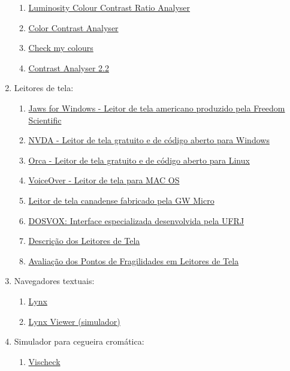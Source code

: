 \documentclass[
  12pt,
  openright,
  twoside,
  a4paper,
  english,
  french,
  spanish,
  brazil
]{abntex2}
\begin{document}
\begin{enumerate}
  \begin{enumerate}
    \item \href{http://juicystudio.com/services/luminositycontrastratio.php}{Luminosity Colour Contrast Ratio Analyser}
    \item \href{http://www.colorsontheweb.com/colorcontrast.asp}{Color Contrast Analyser}
    \item \href{http://www.checkmycolours.com}{Check my colours}
    \item \href{http://www.paciellogroup.com/resources/contrast-analyser.html}{Contrast Analyser 2.2}
  \end{enumerate}
  \item Leitores de tela:
  \begin{enumerate}
    \item \href{http://www.freedomscientific.com}{Jaws for Windows - Leitor de tela americano produzido pela Freedom Scientific}
    \item \href{http://www.nvda-project.org}{NVDA - Leitor de tela gratuito e de código aberto para Windows}
    \item \href{http://live.gnome.org/Orca}{Orca - Leitor de tela gratuito e de código aberto para Linux}
    \item \href{http://www.apple.com/br/accessibility/ios/voiceover}{VoiceOver - Leitor de tela para MAC OS}
    \item \href{http://www.gwmicro.com/Window-Eyes}{Leitor de tela canadense fabricado pela GW Micro}
    \item \href{http://intervox.nce.ufrj.br}{DOSVOX: Interface especializada desenvolvida pela UFRJ}
    \item \href{https://www.gov.br/governodigital/pt-br/acessibilidade-e-usuario/acessibilidade-digital/emag-descricao-dos-leitores-de-tela-1.pdf}{Descrição dos Leitores de Tela}
    \item \href{https://www.gov.br/governodigital/pt-br/acessibilidade-e-usuario/acessibilidade-digital/emag-pontos-de-fragilidade-dos-leitores-de-tela.pdf}{Avaliação dos Pontos de Fragilidades em Leitores de Tela}
  \end{enumerate}
  \item Navegadores textuais:
  \begin{enumerate}
    \item \href{http://lynx.browser.org}{Lynx}
    \item \href{http://www.delorie.com/web/lynxview.html}{Lynx Viewer (simulador)}
  \end{enumerate}
  \item Simulador para cegueira cromática:
  \begin{enumerate}
    \item \href{http://www.vischeck.com}{Vischeck}
  \end{enumerate}


\end{enumerate}
\end{document}
